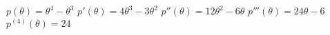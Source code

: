 {$p(\theta) = \theta^4-\theta^3$
}
{$p'(\theta) = 4\theta^3-3\theta^2$ $p''(\theta) = 12\theta^2 - 6\theta$ $p'''(\theta) = 24\theta-6$ $p^{(4)}(\theta) = 24$
}
